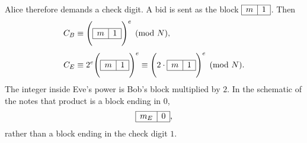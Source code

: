 \begin{example}
Alice therefore demands a check digit. A bid is sent as the block
$\begin{array}{|c|c|}\hline m & 1\\\hline\end{array}$.
Then
\begin{align*}
    C_{B}
    &\equiv
    \Biggl(
        \begin{array}{|c|c|}
            \hline
            m & 1\\
            \hline
        \end{array}
    \Biggr)^{e}
    \pmod{N},\\[0.4em]
    C_{E}
    &\equiv
    2^{e}
    \Biggl(
        \begin{array}{|c|c|}
            \hline
            m & 1\\
            \hline
        \end{array}
    \Biggr)^{e}
    \equiv
    \Biggl(
        2\cdot
        \begin{array}{|c|c|}
            \hline
            m & 1\\
            \hline
        \end{array}
    \Biggr)^{e}
    \pmod{N}.
\end{align*}
The integer inside Eve's power is Bob's block multiplied by $2$. In the
schematic of the notes that product is a block ending in $0$,
\[
    \begin{array}{|c|c|}
        \hline
        m_{E} & 0\\
        \hline
    \end{array},
\]
rather than a block ending in the check digit $1$.
\end{example}


